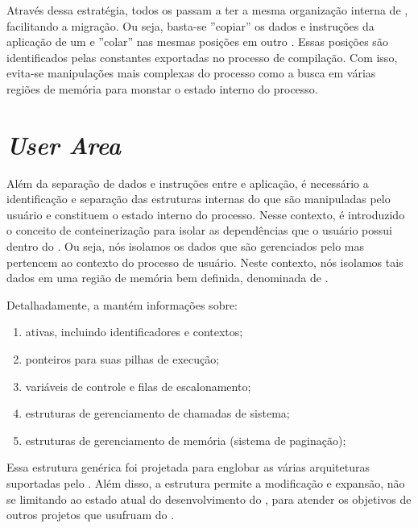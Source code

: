     Através dessa estratégia, todos os \clusters passam a ter a mesma organização interna de , facilitando a migração. Ou seja, basta-se ''copiar'' os dados e instruções da aplicação de um \cluster e ''colar'' nas mesmas posições em outro \cluster. Essas posições são identificados pelas constantes exportadas no processo de compilação. Com isso, evita-se manipulações mais complexas do processo como a busca em várias regiões de memória para monstar o estado interno do processo.

    
\section{\textit{User Area}}
\label{sec.uarea}

    Além da separação de dados e instruções entre  e aplicação, é necessário a identificação e separação das estruturas internas do \so que são manipuladas pelo usuário e constituem o estado interno do processo. Nesse contexto, é introduzido o conceito de conteinerização para isolar as dependências que o usuário possui dentro do \cluster. Ou seja, nós isolamos os dados que são gerenciados pelo  mas pertencem ao contexto do processo de usuário. Neste contexto, nós isolamos tais dados em uma região de memória bem definida, denominada de \uarea. 

    Detalhadamente, a \uarea mantém informações sobre:
    \begin{enumerate}[label=(\roman*)]
        \item \threads ativas, incluindo identificadores e contextos;
        \item ponteiros para suas pilhas de execução; 
        \item variáveis de controle e filas de escalonamento;
        \item estruturas de gerenciamento de chamadas de sistema;
        \item estruturas de gerenciamento de memória (\eg sistema de paginação);
    \end{enumerate}

    Essa estrutura genérica foi projetada para englobar as várias arquiteturas suportadas pelo \nanvix. Além disso, a estrutura permite a modificação e expansão, não se limitando ao estado atual do desenvolvimento do \nanvix, para atender os objetivos de outros projetos que usufruam do \nanvix.

